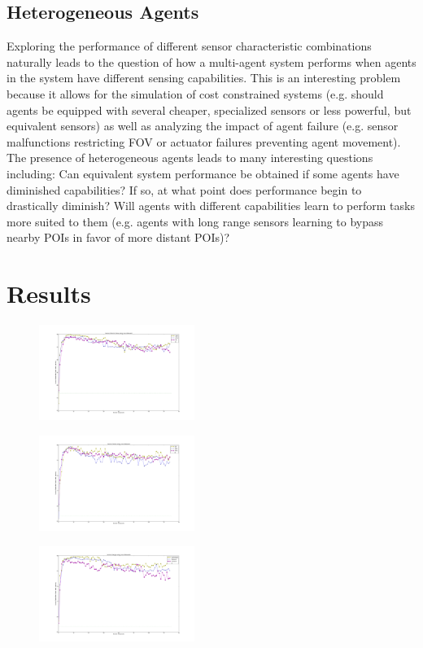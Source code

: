 \documentclass[letterpaper, 10 pt, conference]{ieeeconf}  %
\begin{document}
\subsection{Heterogeneous Agents}
Exploring the performance of different sensor characteristic combinations naturally leads to the question of how a multi-agent system performs when agents in the system have different sensing capabilities. This is an interesting problem because it allows for the simulation of cost constrained systems (e.g. should agents be equipped with several cheaper, specialized sensors or less powerful, but equivalent sensors) as well as analyzing the impact of agent failure (e.g. sensor malfunctions restricting FOV or actuator failures preventing agent movement). The presence of heterogeneous agents leads to many interesting questions including: Can equivalent system performance be obtained if some agents have diminished capabilities? If so, at what point does performance begin to drastically diminish? Will agents with different capabilities learn to perform tasks more suited to them (e.g. agents with long range sensors learning to bypass nearby POIs in favor of more distant POIs)?


\section{Results}

\begin{figure}[h!]
    \centering
    \includegraphics[width=0.45\textwidth]{SF_LocalReward.png}
    \caption{}
    \label{fig:}
\end{figure}

\begin{figure}[h!]
    \centering
    \includegraphics[width=0.45\textwidth]{SN_LocalReward.png}
    \caption{ }
    \label{fig:}
\end{figure}

\begin{figure}[h!]
    \centering
    \includegraphics[width=0.45\textwidth]{SR_LocalReward.png}
    \caption{}
    \label{fig:}
\end{figure}





\end{document}
